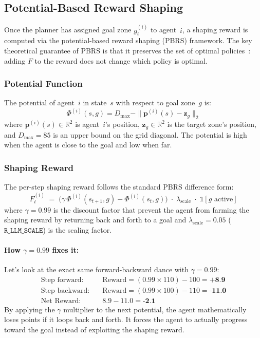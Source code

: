 \subsection{Potential-Based Reward Shaping}
\label{sec:pbrs}

Once the planner has assigned goal zone $g^{(i)}_t$ to agent~$i$,
a shaping reward is computed via the potential-based reward shaping
(PBRS) framework. The key theoretical guarantee of PBRS
is that it preserves the set of optimal policies~\parencite{Ng_Harada_Russell_1999}: adding $F$ to
the reward does not change which policy is optimal.

\subsubsection{Potential Function}
The potential of agent~$i$ in state~$s$ with respect to goal zone~$g$ is:
\begin{equation}
\label{eq:potential}
    \Phi^{(i)}(s, g) = D_{\max} - \|\mathbf{p}^{(i)}(s) - \mathbf{z}_g\|_2
\end{equation}
where $\mathbf{p}^{(i)}(s)\in\mathbb{R}^2$ is agent~$i$'s position,
$\mathbf{z}_g\in\mathbb{R}^2$ is the target zone's position, and
$D_{\max}=85$ is an upper bound on the grid diagonal.
The potential is high when the agent is close to the goal and low when far.

\subsubsection{Shaping Reward}
The per-step shaping reward follows the standard PBRS difference form:
\begin{equation}
\label{eq:shaping_reward}
    F_t^{(i)}
    \;=\;
    \bigl(\gamma\,\Phi^{(i)}(s_{t+1}, g) - \Phi^{(i)}(s_t, g)\bigr)
    \;\cdot\;
    \lambda_{\text{scale}}
    \;\cdot\;
    \mathds{1}[g \text{ active}]
\end{equation}
where $\gamma=0.99$ is the discount factor that prevent the agent from farming the 
shaping reward by returning back and forth to a goal and $\lambda_{\text{scale}} = 0.05$ ($\texttt{R\_LLM\_SCALE}$) is the scaling factor.

\paragraph{How $\gamma = 0.99$ fixes it:} Let's look at the exact same forward-backward dance with $\gamma = 0.99$:
\begin{align*}
    \text{Step forward:} \quad & \text{Reward} = (0.99 \times 110) - 100 = \textbf{+8.9}\\
    \text{Step backward:} \quad & \text{Reward} = (0.99 \times 100) - 110 = \textbf{-11.0}\\
    \text{Net Reward:} \quad & 8.9 - 11.0 = \textbf{-2.1}
\end{align*}
By applying the $\gamma$ multiplier to the next potential, the agent mathematically loses points if it loops back and forth. It forces the agent to actually progress toward the goal instead of exploiting the shaping reward.

